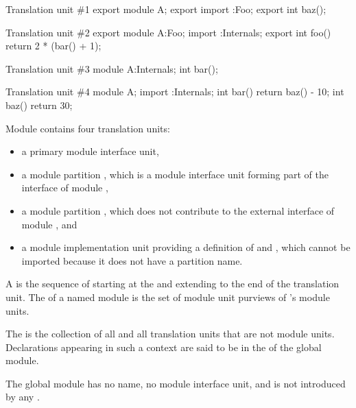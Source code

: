 \pnum
\begin{example}
\begin{codeblocktu}{Translation unit \#1}
export module A;
export import :Foo;
export int baz();
\end{codeblocktu}

\begin{codeblocktu}{Translation unit \#2}
export module A:Foo;
import :Internals;
export int foo() { return 2 * (bar() + 1); }
\end{codeblocktu}

\begin{codeblocktu}{Translation unit \#3}
module A:Internals;
int bar();
\end{codeblocktu}

\begin{codeblocktu}{Translation unit \#4}
module A;
import :Internals;
int bar() { return baz() - 10; }
int baz() { return 30; }
\end{codeblocktu}

Module  contains four translation units:
\begin{itemize}
\item a primary module interface unit,
\item a module partition , which is a module interface unit
forming part of the interface of module ,
\item a module partition , which does not contribute
to the external interface of module , and
\item a module implementation unit providing
a definition of  and ,
which cannot be imported because
it does not have a partition name.
\end{itemize}
\end{example}

\pnum
A  is
the sequence of 
starting at the 
and extending to the end of the translation unit.
The 
of a named module  is the set of module unit purviews
of 's module units.

\pnum
The  is the collection of all
and all translation units that are not module units.
Declarations appearing in such a context
are said to be in the  of the global module.
\begin{note}
The global module has no name, no module interface unit, and is not
introduced by any .
\end{note}

